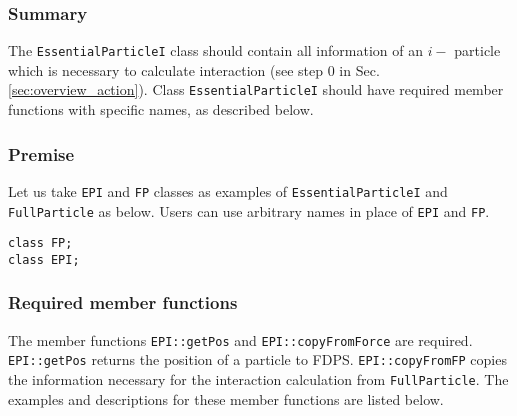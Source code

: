 \subsubsection{Summary}

The \texttt{EssentialParticleI} class should contain all information of
an $i-$ particle which is necessary to calculate interaction
(see step 0 in Sec. \ref{sec:overview_action}).
Class \texttt{EssentialParticleI} should have required member functions
with specific names, as described below.

\subsubsection{Premise}

Let us take \texttt{EPI} and \texttt{FP} classes as examples of
\texttt{EssentialParticleI} and \texttt{FullParticle} as below.
Users can use arbitrary names in place of \texttt{EPI} and \texttt{FP}.

\begin{screen}
\begin{verbatim}
class FP;
class EPI;
\end{verbatim}
\end{screen}

\subsubsection{Required member functions}


The member functions \texttt{EPI::getPos} and \texttt{EPI::copyFromForce} are required.
\texttt{EPI::getPos} returns the position of a particle to FDPS.
\texttt{EPI::copyFromFP} copies the information necessary for the interaction calculation from \texttt{FullParticle}.
The examples and descriptions for these member functions are listed below.

